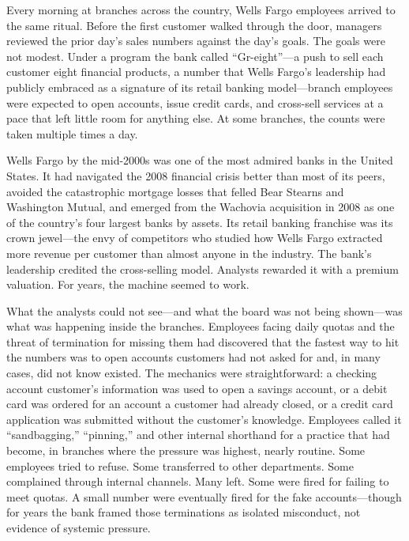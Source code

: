 \documentclass[11pt,openany]{book}
\begin{document}
\begin{corporateexample}

Every morning at branches across the country, Wells Fargo employees arrived
to the same ritual. Before the first customer walked through the door,
managers reviewed the prior day's sales numbers against the day's goals. The
goals were not modest. Under a program the bank called
``Gr-eight''---a push to sell each customer eight financial products, a
number that Wells Fargo's leadership had publicly embraced as a signature of
its retail banking model---branch employees were expected to open accounts,
issue credit cards, and cross-sell services at a pace that left little room
for anything else. At some branches, the counts were taken multiple times a
day.

Wells Fargo by the mid-2000s was one of the most admired banks in the United
States. It had navigated the 2008 financial crisis better than most of its
peers, avoided the catastrophic mortgage losses that felled Bear Stearns and
Washington Mutual, and emerged from the Wachovia acquisition in 2008 as one
of the country's four largest banks by assets. Its retail banking franchise
was its crown jewel---the envy of competitors who studied how Wells Fargo
extracted more revenue per customer than almost anyone in the industry. The
bank's leadership credited the cross-selling model. Analysts rewarded it with
a premium valuation. For years, the machine seemed to work.

What the analysts could not see---and what the board was not being
shown---was what was happening inside the branches. Employees facing daily
quotas and the threat of termination for missing them had discovered that the
fastest way to hit the numbers was to open accounts customers had not asked
for and, in many cases, did not know existed. The mechanics were
straightforward: a checking account customer's information was used to open a
savings account, or a debit card was ordered for an account a customer had
already closed, or a credit card application was submitted without the
customer's knowledge. Employees called it ``sandbagging,'' ``pinning,'' and
other internal shorthand for a practice that had become, in branches where
the pressure was highest, nearly routine. Some employees tried to refuse.
Some transferred to other departments. Some complained through internal
channels. Many left. Some were fired for failing to meet quotas. A small
number were eventually fired for the fake accounts---though for years the
bank framed those terminations as isolated misconduct, not evidence of
systemic pressure.


\end{corporateexample}
\end{document}
